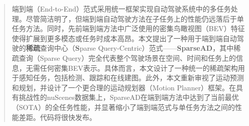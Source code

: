 \begin{abstract}

端到端（End-to-End）范式采用统一框架实现自动驾驶系统中的多任务处理。尽管简洁明了，但端到端自动驾驶方法在子任务上的性能仍远落后于单任务方法。同时，先前端到端方法中广泛使用的密集鸟瞰视图（BEV）特征使得扩展到更多模态或任务时成本高昂。本文提出了一种用于端到端自动驾驶的\textbf{稀疏}查询中心（\textbf{S}parse Query-Centric）范式——\textbf{SparseAD}，其中稀疏查询（Sparse Query）完全代表整个驾驶场景在空间、时间和任务上的信息，无需任何密集BEV表示。具体而言，本文设计了一种统一的稀疏架构用于感知任务，包括检测、跟踪和在线建图。此外，本文重新审视了运动预测和规划，并设计了一个更合理的运动规划器（Motion Planner）框架。在具有挑战性的nuScenes数据集上，SparseAD在端到端方法中达到了当前最优（SOTA）的全任务性能，并显著缩小了端到端范式与单任务方法之间的性能差距。代码将很快发布。


\end{abstract}

